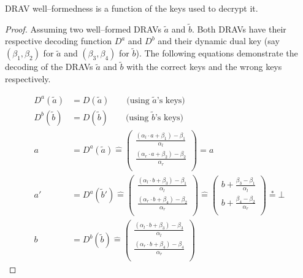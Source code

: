 \begin{lem}
  \label{lem:well-formed-fun-of-dec-fun}

  DRAV well--formedness is a function of the keys used to decrypt it.

\end{lem}
\begin{proof}

  Assuming two well--formed DRAVs $\widetilde{a}$ and $\widetilde{b}$. Both
  DRAVs have their respective decoding function $D^a$ and $D^b$ and their
  dynamic dual key (say $(\beta_1, \beta_2)$ for $\widetilde{a}$ and
  $(\beta_3, \beta_4)$ for $\widetilde{b}$). The following equations demonstrate
  the decoding of the DRAVs $\widetilde{a}$ and $\widetilde{b}$ with the correct
  keys and the wrong keys respectively.

  \begin{align*}
    D^a(\widetilde{a}) &= D(\widetilde{a}) \qquad\text{(using $\widetilde{a}$'s
    keys)}\\
    D^b(\widetilde{b}) &= D(\widetilde{b}) \qquad\text{(using $\widetilde{b}$'s
    keys)}\\
    a &= D^a(\widetilde{a}) \hat{=}
    \begin{pmatrix}
      \frac{(\alpha_l \cdot a + \beta_1) - \beta_1}{\alpha_l}\\
      \frac{(\alpha_r \cdot a + \beta_2) - \beta_2}{\alpha_r}\\
    \end{pmatrix}
    = a\\
    a' &= D^a(\widetilde{b}')
    \hat{=}
    \begin{pmatrix}
      \frac{(\alpha_l \cdot b + \beta_3) - \beta_1}{\alpha_l}\\
      \frac{(\alpha_r \cdot b + \beta_4) - \beta_2}{\alpha_r}\\
    \end{pmatrix}
    \hat{=}
    \begin{pmatrix}
      b +
      \frac{\beta_3 - \beta_1}{\alpha_l}\\
      b +
      \frac{\beta_4 - \beta_2}{\alpha_r}\\
    \end{pmatrix}
    \stackrel{*}{=} \bot\\
    b &= D^b(\widetilde{b}) \hat{=}
    \begin{pmatrix}
      \frac{(\alpha_l \cdot b + \beta_3) - \beta_3}{\alpha_l}\\
      \frac{(\alpha_r \cdot b + \beta_4) - \beta_4}{\alpha_r}\\

\end{pmatrix}
\end{align*}
\end{proof}
